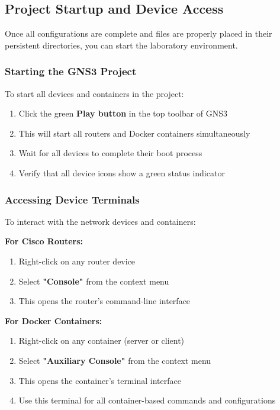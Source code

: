 \subsection{Project Startup and Device Access}

Once all configurations are complete and files are properly placed in their persistent directories, you can start the laboratory environment.

\subsubsection{Starting the GNS3 Project}

To start all devices and containers in the project:

\begin{enumerate}
    \item Click the green \textbf{Play button} in the top toolbar of GNS3
    \item This will start all routers and Docker containers simultaneously
    \item Wait for all devices to complete their boot process
    \item Verify that all device icons show a green status indicator
\end{enumerate}

\subsubsection{Accessing Device Terminals}

To interact with the network devices and containers:

\textbf{For Cisco Routers:}
\begin{enumerate}
    \item Right-click on any router device
    \item Select \textbf{"Console"} from the context menu
    \item This opens the router's command-line interface
\end{enumerate}

\noindent
\textbf{For Docker Containers:}
\begin{enumerate}
    \item Right-click on any container (server or client)
    \item Select \textbf{"Auxiliary Console"} from the context menu
    \item This opens the container's terminal interface
    \item Use this terminal for all container-based commands and configurations
\end{enumerate}

